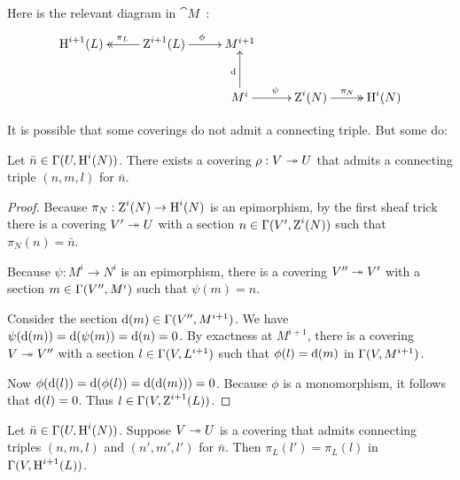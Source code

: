 Here is the relevant diagram in $\cat{M}$~:
\[ \UseTips \xymatrix @C=6ex @R=6ex {
\opn{H}^{i + 1}(L)
&
\opn{Z}^{i + 1}(L)
\ar@{->>}[l]_{\pi_L}
\ar[r]^{\phi}
&
M^{i + 1}
&
\\
&
&
M^{i}
\ar[u]^{\d}
\ar[r]^{\psi}
&
\opn{Z}^{i}(N)
\ar@{->>}[r]^{\pi_N}
&
\opn{H}^{i}(N)
} \]

It is possible that some coverings do not admit a connecting triple. But some 
do:

\begin{lem} \label{lem:3650}
Let $\bar{n} \in \Gamma(U, \operatorname{H}^i(N))$. 
There exists a covering $\rho : V \twoheadrightarrow U$ that admits a connecting triple 
$(n, m, l)$ for $\bar{n}$.
\end{lem}

\begin{proof}
Because $\pi_N : \operatorname{Z}^{i}(N) \to \operatorname{H}^{i}(N)$ is an epimorphism, by 
the first sheaf trick there is a covering $V' \twoheadrightarrow U$ with 
a section $n \in \Gamma(V', \operatorname{Z}^{i}(N))$
such that $\pi_N(n) = \bar{n}$. 

Because $\psi : M^i \to N^i$ is an epimorphism, there is a covering 
$V'' \twoheadrightarrow V'$ with 
a section $m \in \Gamma(V'', M^i)$ such that $\psi(m) = n$. 

Consider the section $\mathrm{d}(m) \in \Gamma(V'', M^{i + 1})$. 
We have 
$\psi(\mathrm{d}(m)) = \mathrm{d}(\psi(m)) = \mathrm{d}(n) = 0$.
By exactness at $M^{i + 1}$, there is a covering $V \twoheadrightarrow V''$ with 
a section $l \in \Gamma(V, L^{i + 1})$ such that $\phi(l) = \mathrm{d}(m)$
in $\Gamma(V, M^{i + 1})$. 

Now 
$\phi(\mathrm{d}(l)) = \mathrm{d}(\phi(l)) = \mathrm{d}(\mathrm{d}(m))) = 0$.
Because $\phi$ is a monomorphism, it follows that $\mathrm{d}(l) = 0$. Thus 
$l \in \Gamma(V, \operatorname{Z}^{i + 1}(L))$. 
\end{proof}

\begin{lem} \label{lem:3651} 
Let $\bar{n} \in \Gamma(U, \operatorname{H}^i(N))$. Suppose $V \twoheadrightarrow U$
is a covering that admits connecting triples 
$(n, m, l)$ and $(n', m', l')$ for $\bar{n}$.
Then 
$\pi_L(l') = \pi_L(l)$ in $\Gamma(V, \operatorname{H}^{i + 1}(L))$.
\end{lem}

